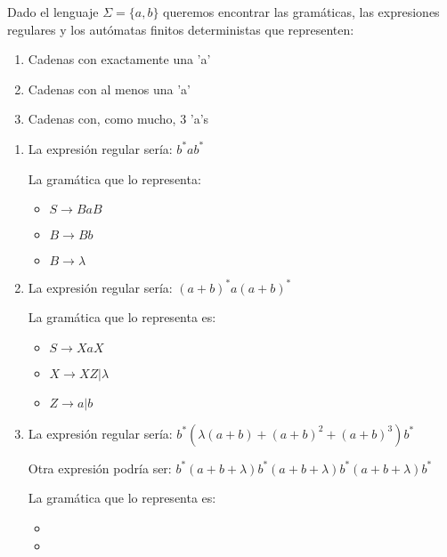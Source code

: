 \begin{problem}
Dado el lenguaje $\Sigma = \lbrace a,b \rbrace$ queremos encontrar las gramáticas, las expresiones regulares y los autómatas finitos deterministas que representen:
\begin{enumerate}
\item Cadenas con exactamente una 'a'
\item Cadenas con al menos una 'a'
\item Cadenas con, como mucho, 3 'a's
\end{enumerate}
\solution

\begin{enumerate}
\item 
La expresión regular sería: $b^*a b^*$

La gramática que lo representa:

\begin{itemize}
\item $S \rightarrow BaB$
\item $B \rightarrow Bb$
\item $B \rightarrow \lambda$
\end{itemize}


\item 
La expresión regular sería: $(a+b)^* a (a+b)^* $

La gramática que lo representa es:
\begin{itemize}
\item $S \rightarrow XaX$
\item $X \rightarrow XZ | \lambda$
\item $Z \rightarrow a | b$
\end{itemize}

\item 
La expresión regular sería: $b^* (\lambda (a+b) + (a+b)^2 + (a+b)^3) b^*$

Otra expresión podría ser: $b^*(a+b+\lambda)b^*(a+b+\lambda)b^*(a+b+\lambda) b^*$

La gramática que lo representa es:
\begin{itemize}
\item
\item
\end{itemize}

\end{enumerate}
\end{problem}

